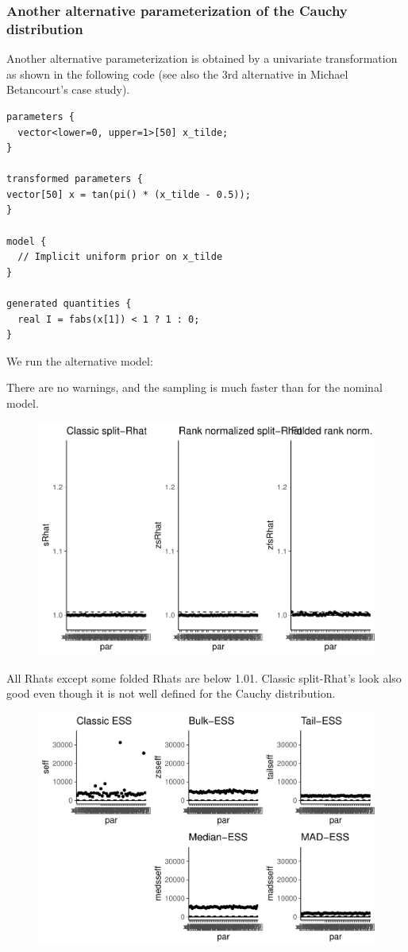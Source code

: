 \documentclass[american,]{article}
\begin{document}
\hypertarget{another-alternative-parameterization-of-the-cauchy-distribution}{%
\subsubsection*{Another alternative parameterization of the Cauchy
distribution}\label{another-alternative-parameterization-of-the-cauchy-distribution}}

Another alternative parameterization is obtained by a univariate
transformation as shown in the following code (see also the 3rd
alternative in Michael Betancourt's case study).

\begin{verbatim}
parameters {
  vector<lower=0, upper=1>[50] x_tilde;
}

transformed parameters {
vector[50] x = tan(pi() * (x_tilde - 0.5));
}

model {
  // Implicit uniform prior on x_tilde
}

generated quantities {
  real I = fabs(x[1]) < 1 ? 1 : 0;
}
\end{verbatim}

We run the alternative model:

There are no warnings, and the sampling is much faster than for the
nominal model.

\begin{figure}[tp]
  \centering
  \includegraphics[width=0.6\linewidth]{graphics/rhat-fit-alt3-1.pdf}
\end{figure}

All Rhats except some folded Rhats are below 1.01. Classic split-Rhat's
look also good even though it is not well defined for the Cauchy
distribution.

\begin{figure}[tp]
  \centering
  \includegraphics[width=0.6\linewidth]{graphics/ess-fit-alt3-1.pdf}
\end{figure}
\end{document}
